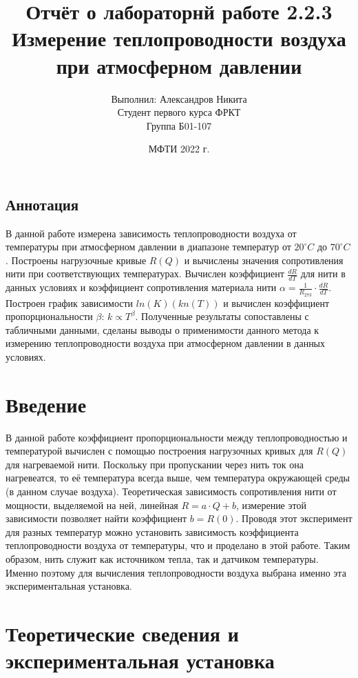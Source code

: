 \documentclass[a4paper,14pt]{article}
\title{Отчёт о лабораторнй работе 2.2.3\\Измерение теплопроводности воздуха при атмосферном давлении}
\author{Выполнил: Александров Никита\\ Студент первого курса ФРКТ\\Группа Б01-107}
\date{МФТИ 2022 г.}
\begin{document}
\maketitle
\newpage
\begin{center}
\tableofcontents
\end{center}
\newpage

\begin{center}
\section*{Аннотация}
\end{center}

В данной работе измерена зависимость теплопроводности воздуха от температуры при атмосферном давлении в диапазоне температур от $20^{\circ}C$ до $70^{\circ}C$. Построены нагрузочные кривые $R(Q)$ и вычислены значения сопротивления нити при соответствующих температурах. Вычислен коэффициент $\frac{dR}{dT}$ для нити в данных условиях и коэффициент сопротивления материала нити $\alpha = \frac{1}{R_{273}} \cdot \frac{dR}{dT}$. Построен график зависимости $ln(K)(kn(T))$ и вычислен коэффициент пропорциональности $\beta$: $k \propto T^{\beta}$. Полученные результаты сопоставлены с табличными данными, сделаны выводы о применимости данного метода к измерению теплопроводности воздуха при атмосферном давлении в данных условиях.

\section{Введение}

В данной работе коэффициент пропорциональности между теплопроводностью и температурой вычислен с помощью построения нагрузочных кривых для $R(Q)$ для нагреваемой нити. Поскольку при пропускании через нить ток она нагревеатся, то её температура всегда выше, чем температура окружающей среды (в данном случае воздуха). Теоретическая зависимость сопротивления нити от мощности, выделяемой на ней, линейная $R = a \cdot Q + b$, измерение этой зависимости позволяет найти коэффициент $b = R(0)$. Проводя этот эксперимент для разных температур можно установить зависимость коэффициента теплопроводности воздуха от температуры, что и проделано в этой работе. Таким образом, нить служит как источником тепла, так и датчиком температуры. Именно поэтому для вычисления теплопроводности воздуха выбрана именно эта экспериментальная установка.

\section{Теоретические сведения и экспериментальная установка}
\end{document}
